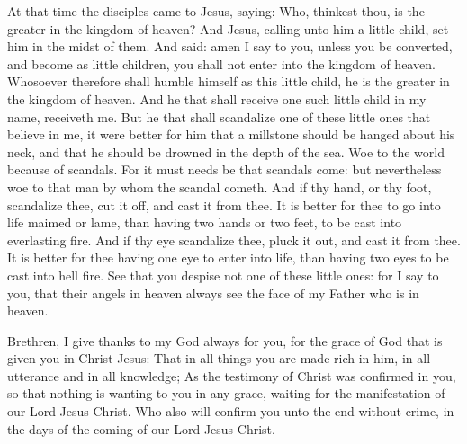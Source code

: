 \begin{multicols}{2}

At that time the disciples came to Jesus, saying: Who, thinkest
thou, is the greater in the kingdom of heaven?
And Jesus, calling unto him a little child, set him in the midst
of them.
And said: amen I say to you, unless you be converted, and become
as little children, you shall not enter into the kingdom of heaven.
Whosoever therefore shall humble himself as this little child, he
is the greater in the kingdom of heaven.
And he that shall receive one such little child in my name,
receiveth me.
But he that shall scandalize one of these little ones that believe
in me, it were better for him that a millstone should be hanged about
his neck, and that he should be drowned in the depth of the sea.
Woe to the world because of scandals. For it must needs be that
scandals come: but nevertheless woe to that man by whom the scandal
cometh.
And if thy hand, or thy foot, scandalize thee, cut it off, and
cast it from thee. It is better for thee to go into life maimed or lame,
than having two hands or two feet, to be cast into everlasting fire.
And if thy eye scandalize thee, pluck it out, and cast it from
thee. It is better for thee having one eye to enter into life, than
having two eyes to be cast into hell fire.
See that you despise not one of these little ones: for I say to
you, that their angels in heaven always see the face of my Father who is
in heaven.


\bigskip





Brethren, I give thanks to my God always for you, for the grace of God that
is given you in Christ Jesus:
That in all things you are made rich in him, in all utterance and
in all knowledge;
As the testimony of Christ was confirmed in you,
so that nothing is wanting to you in any grace, waiting for the
manifestation of our Lord Jesus Christ.
Who also will confirm you unto the end without crime, in the days
of the coming of our Lord Jesus Christ.




\end{multicols}

